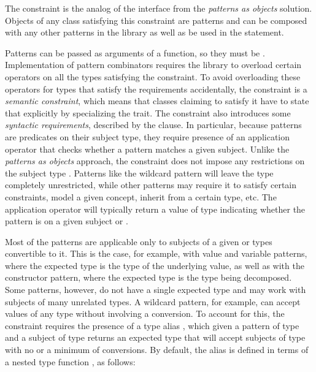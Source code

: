 
\noindent
The  constraint is the analog of the  interface from the 
\emph{patterns as objects} solution. Objects of any class  satisfying 
this constraint are patterns and can be composed with any other patterns in the 
library as well as be used in the  statement. 

Patterns can be passed as arguments of a function, so they must be
. Implementation of pattern combinators requires the 
library to overload certain operators on all the types satisfying the 
constraint. To avoid overloading these operators for types that satisfy the 
requirements accidentally, the  constraint is a \emph{semantic constraint}, 
which means that classes claiming to satisfy it have to state that explicitly by specializing the
 trait. The constraint also introduces some \emph{syntactic 
requirements}, described by the  clause. In particular, because 
patterns are predicates on their subject type, they require presence of an 
application operator that checks whether a pattern matches a given subject. 
Unlike the \emph{patterns as objects} approach, the  constraint does not impose 
any restrictions on the subject type . Patterns like the wildcard 
pattern will leave the  type completely unrestricted, while other 
patterns may require it to satisfy certain constraints, model a given concept, 
inherit from a certain type, etc. 
The application operator will typically return a value of type  
indicating whether the pattern is  on a given subject 
or . %

Most of the patterns are applicable only to subjects of a given  
or types convertible to it. This is the case, for example, with value and  
variable patterns, where the expected type is the type of the underlying value, 
as well as with the constructor pattern, where the expected type is the type 
being decomposed. Some patterns, however, do not have a single 
expected type and may work with subjects of many unrelated types. A wildcard 
pattern, for example, can accept values of any type without involving a 
conversion. To account for this, the  constraint requires the presence of 
a type alias , which given a pattern of type  and 
a subject of type  returns an expected type  
that will accept subjects of type  with no or a minimum of conversions. 
By default, the alias is defined in terms of a nested type function 
, as follows:

